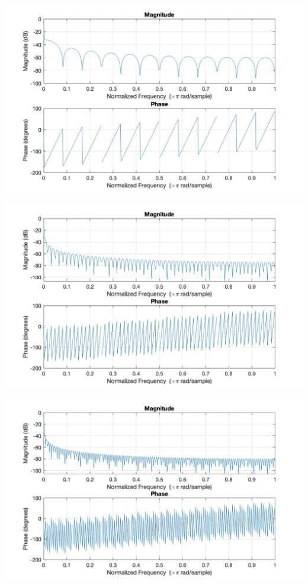 \documentclass[8pt]{article}  %
\theoremstyle{plain}
\theoremstyle{definition}
\theoremstyle{remark}
\begin{document}
    {
    \centering
    \begin{minipage}{0.3\textwidth}
    \includegraphics[width=\linewidth]{figure/filter_length_1000.jpg}
    \end{minipage}
    \begin{minipage}{0.3\textwidth}
    \includegraphics[width=\linewidth]{figure/filter_length_5000.jpg}
    \end{minipage}
    \begin{minipage}{0.3\textwidth}
    \includegraphics[width=\linewidth]{figure/filter_length_10000.jpg}
    \end{minipage}}
    
\end{document}
